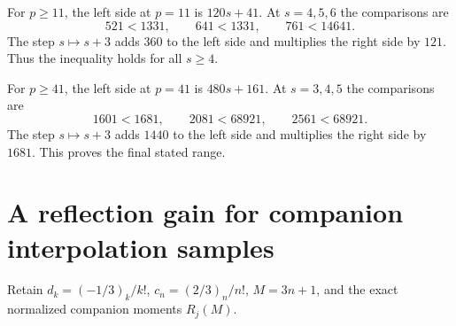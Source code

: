 \documentclass[11pt,letterpaper]{article}
\numberwithin{equation}{section}
\begin{document}
For $p\ge11$, the left side at $p=11$ is $120s+41$.
At $s=4,5,6$ the comparisons are
\[
 521<1331,\qquad641<1331,\qquad761<14641.
\]
The step $s\mapsto s+3$ adds $360$ to the left side and multiplies
the right side by $121$. Thus the inequality holds for all $s\ge4$.

For $p\ge41$, the left side at $p=41$ is $480s+161$.
At $s=3,4,5$ the comparisons are
\[
 1601<1681,\qquad2081<68921,\qquad2561<68921.
\]
The step $s\mapsto s+3$ adds $1440$ to the left side and multiplies
the right side by $1681$. This proves the final stated range.


\section{A reflection gain for companion interpolation samples}\label{loc-VIII-11}
\label{VIII-sec:e-companion-sample-gain}
Retain $d_k=(-1/3)_k/k!$, $c_n=(2/3)_n/n!$, $M=3n+1$,
and the exact normalized companion moments $R_j(M)$.
\end{document}
